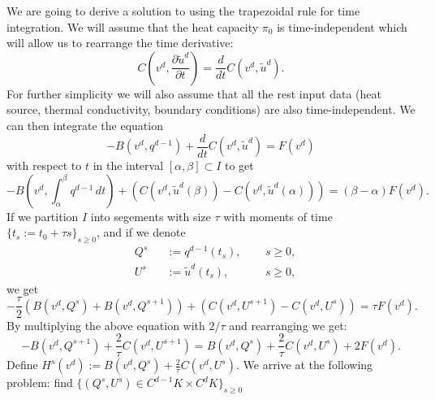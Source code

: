 \begin{discussion}
  \label{cmc/diffusion/discrete/transient/mixed_weak_solve_trapezoidal-discussion}
  We are going to derive a solution to
  using the trapezoidal rule for time integration.
  We will assume that the heat capacity $\pi_0$ is time-independent which will
  allow us to rearrange the time derivative:
  \begin{equation}
    C(v^d, \frac{\partial \tilde{u}^d} {\partial t})
    = \frac{d}{d t} C(v^d, \tilde{u}^d).
  \end{equation}
  For further simplicity we will also assume that all the rest input data (heat
  source, thermal conductivity, boundary conditions) are also time-independent.
  We can then integrate the equation
  \begin{equation}
    - B(v^d, q^{d - 1}) + \frac{d}{d t} C(v^d, \tilde{u}^d) = F(v^d)
  \end{equation}
  with respect to $t$ in the interval $[\alpha, \beta] \subset I$ to get
  \begin{equation}
    - B(v^d, \int_\alpha^\beta q^{d - 1}\, d t)
    + (C(v^d, \tilde{u}^d(\beta)) - C(v^d, \tilde{u}^d(\alpha)))
    = (\beta - \alpha) F(v^d).
  \end{equation}
  If we partition $I$ into segements with size $\tau$ with moments of
  time $\{t_s := t_0 + \tau s\}_{s \geq 0}$, and if we denote
  \begin{subequations}
    \begin{alignat}{3}
      & Q^s
      && := q^{d - 1}(t_s), \enspace
      && s \geq 0, \\
      & U^s
      && := \tilde{u}^d(t_s), \enspace
      && s \geq 0,
    \end{alignat}
  \end{subequations}
  we get
  \begin{equation}
    - \frac{\tau}{2} (B(v^d, Q^s) + B(v^d, Q^{s + 1}))
    + (C(v^d, U^{s + 1}) - C(v^d, U^s))
    = \tau F(v^d).
  \end{equation}
  By multiplying the above equation with $2 / \tau$ and rearranging we get:
  \begin{equation}
    - B(v^d, Q^{s + 1}) + \frac{2}{\tau} C(v^d, U^{s + 1})
    = B(v^d, Q^s) + \frac{2}{\tau} C(v^d, U^s) + 2 F(v^d).
  \end{equation}
  Define $H^s(v^d) := B(v^d, Q^s) + \frac{2}{\tau} C(v^d, U^s)$.
  We arrive at the following problem: find
  $\{(Q^s, U^s) \in C^{d - 1} K \times C^d K\}_{s \geq 0}$

\end{discussion}
